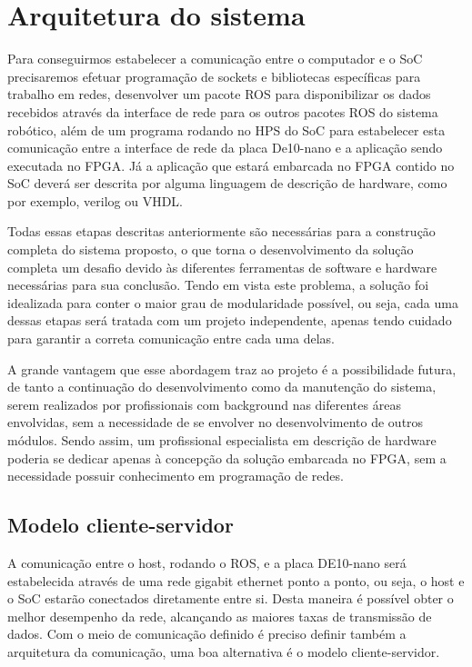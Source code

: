 \chapter{Arquitetura do sistema}\label{cap:arquitetura}

Para conseguirmos estabelecer a comunicação entre o computador e o SoC precisaremos efetuar programação de sockets e bibliotecas específicas para trabalho em redes, desenvolver um pacote ROS para disponibilizar os dados recebidos através da interface de rede para os outros pacotes ROS do sistema robótico, além de um programa rodando no HPS do SoC para estabelecer esta comunicação entre a interface de rede da placa De10-nano e a aplicação sendo executada no FPGA\@. Já a aplicação que estará embarcada no FPGA contido no SoC deverá ser descrita por alguma linguagem de descrição de hardware, como por exemplo, verilog ou VHDL\@.

Todas essas etapas descritas anteriormente são necessárias para a construção completa do sistema proposto, o que torna o desenvolvimento da solução completa um desafio devido às diferentes ferramentas de software e hardware necessárias para sua conclusão. Tendo em vista este problema, a solução foi idealizada para conter o maior grau de modularidade possível, ou seja, cada uma dessas etapas será tratada com um projeto independente, apenas tendo cuidado para garantir a correta comunicação entre cada uma delas.

A grande vantagem que esse abordagem traz ao projeto é a possibilidade futura, de tanto a continuação do desenvolvimento como da manutenção do sistema, serem realizados por profissionais com background nas diferentes áreas envolvidas, sem a necessidade de se envolver no desenvolvimento de outros módulos. Sendo assim, um profissional especialista em descrição de hardware poderia se dedicar apenas à concepção da solução embarcada no FPGA, sem a necessidade possuir conhecimento em programação de redes. 

\section{Modelo cliente-servidor}
A comunicação entre o host, rodando o ROS, e a placa DE10-nano será estabelecida através de uma rede gigabit ethernet ponto a ponto, ou seja, o host e o SoC estarão conectados diretamente entre si. Desta maneira é possível obter o melhor desempenho da rede, alcançando as maiores taxas de transmissão de dados. Com o meio de comunicação definido é preciso definir também a arquitetura da comunicação, uma boa alternativa é o modelo cliente-servidor.

